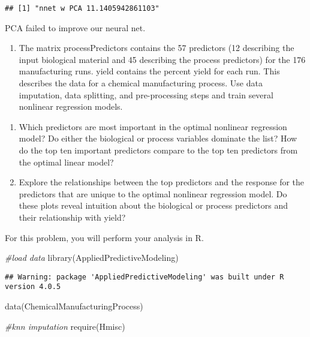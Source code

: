\documentclass[
]{article}
\newenvironment{Shaded}{\begin{snugshade}}{\end{snugshade}}
\newcommand{\CommentTok}[1]{\textcolor[rgb]{0.56,0.35,0.01}{\textit{#1}}}
\newcommand{\FunctionTok}[1]{\textcolor[rgb]{0.00,0.00,0.00}{#1}}
\newcommand{\NormalTok}[1]{#1}
\providecommand{\tightlist}{%
  \setlength{\itemsep}{0pt}\setlength{\parskip}{0pt}}
\begin{document}
\begin{verbatim}
## [1] "nnet w PCA 11.1405942861103"
\end{verbatim}

PCA failed to improve our neural net.

\begin{enumerate}
\def\labelenumi{\arabic{enumi})}
\setcounter{enumi}{2}
\tightlist
\item
  The matrix processPredictors contains the 57 predictors (12 describing
  the input biological material and 45 describing the process
  predictors) for the 176 manufacturing runs. yield contains the percent
  yield for each run. This describes the data for a chemical
  manufacturing process. Use data imputation, data splitting, and
  pre-processing steps and train several nonlinear regression models.
\end{enumerate}

\begin{enumerate}
\def\labelenumi{(\alph{enumi})}
\setcounter{enumi}{1}
\tightlist
\item
  Which predictors are most important in the optimal nonlinear
  regression model? Do either the biological or process variables
  dominate the list? How do the top ten important predictors compare to
  the top ten predictors from the optimal linear model?
\item
  Explore the relationships between the top predictors and the response
  for the predictors that are unique to the optimal nonlinear regression
  model. Do these plots reveal intuition about the biological or process
  predictors and their relationship with yield?
\end{enumerate}

For this problem, you will perform your analysis in R.

\begin{Shaded}
\begin{Highlighting}[]
\CommentTok{\#load data}
\FunctionTok{library}\NormalTok{(AppliedPredictiveModeling)}
\end{Highlighting}
\end{Shaded}

\begin{verbatim}
## Warning: package 'AppliedPredictiveModeling' was built under R version 4.0.5
\end{verbatim}

\begin{Shaded}
\begin{Highlighting}[]
\FunctionTok{data}\NormalTok{(ChemicalManufacturingProcess)}

\CommentTok{\#knn imputation}
\FunctionTok{require}\NormalTok{(Hmisc)}
\end{Highlighting}
\end{Shaded}
\end{document}
